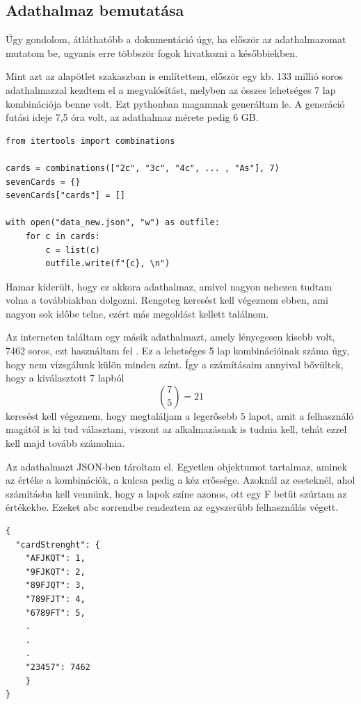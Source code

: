 \subsection{Adathalmaz bemutatása}
Úgy gondolom, átláthatóbb a dokumentáció úgy, ha először az adathalmazomat mutatom be, ugyanis erre többször fogok hivatkozni a későbbiekben. 

Mint azt az alapötlet szakaszban is említettem, először egy kb. 133 millió soros adathalmazzal kezdtem el a megvalósítást, melyben az összes lehetséges 7 lap kombinációja benne volt. Ezt pythonban magamnak generáltam le. A generáció futási ideje 7,5 óra volt, az adathalmaz mérete pedig 6 GB.

\begin{lstlisting}[style=htmlcssjs]
from itertools import combinations

cards = combinations(["2c", "3c", "4c", ... , "As"], 7)
sevenCards = {}
sevenCards["cards"] = []

with open("data_new.json", "w") as outfile:
    for c in cards:
        c = list(c)
        outfile.write(f"{c}, \n")
\end{lstlisting}

Hamar kiderült, hogy ez akkora adathalmaz, amivel nagyon nehezen tudtam volna a továbbiakban dolgozni. Rengeteg keresést kell végeznem ebben, ami nagyon sok időbe telne, ezért más megoldást kellett találnom.

Az interneten találtam egy másik adathalmazt, amely lényegesen kisebb volt, 7462 soros, ezt használtam fel 
\cite{chances}.
Ez a lehetséges 5 lap kombinációinak száma úgy, hogy nem vizsgálunk külön minden színt. Így a számításaim annyival bővültek, hogy a kiválasztott 7 lapból \[ \binom{7}{5}=21\] keresést kell végeznem, hogy megtaláljam a legerősebb 5 lapot, amit a felhasználó magától is ki tud választani, viszont az alkalmazásnak is tudnia kell, tehát ezzel kell majd tovább számolnia.

Az adathalmazt JSON-ben tároltam el. Egyetlen objektumot tartalmaz, aminek az értéke a kombinációk, a kulcsa pedig a kéz erőssége. Azoknál az eseteknél, ahol számításba kell vennünk, hogy a lapok színe azonos, ott egy F betűt szúrtam az értékekbe. Ezeket abc sorrendbe rendeztem az egyszerűbb felhasználás végett.

\begin{lstlisting}[style=htmlcssjs]
{
  "cardStrenght": {
    "AFJKQT": 1,
    "9FJKQT": 2,
    "89FJQT": 3,
    "789FJT": 4,
    "6789FT": 5,
    .
    .
    .
    "23457": 7462
    }
}
\end{lstlisting}

